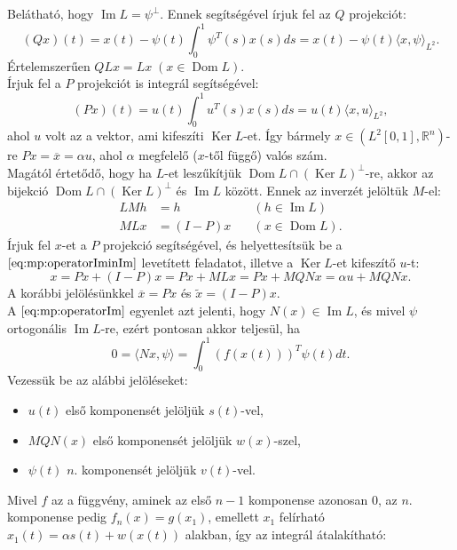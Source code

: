 \documentclass[oneside, titlepage, 12pt, a4paper]{report}
\DeclareMathOperator{\Ima}{Im}	%
\DeclareMathOperator{\Ker}{Ker}	%
\DeclareMathOperator{\Dom}{Dom}	%
\begin{document}
Belátható, hogy $\Ima L = {\psi}^\perp$. %
Ennek segítségével írjuk fel az $Q$ projekciót:
\begin{equation*}
(Qx) (t) = x(t) - \psi(t) \int_0^1 \psi^T(s) x(s) ds = x(t) - \psi(t) \langle x, \psi \rangle_{L^2}.
\end{equation*}
Értelemszerűen $Q L x = L x \; (x \in \Dom L)$. \\
Írjuk fel a $P$ projekciót is integrál segítségével:
\begin{equation*}
(Px)(t) = u(t) \int_0^1 u^T(s) x(s) ds = u(t) \langle x, u \rangle_{L^2},
\end{equation*}
ahol $u$ volt az a vektor, ami kifeszíti $\Ker L$-et. Így bármely $x \in ( L^2[0, 1], \mathbb{R}^n)$-re $Px = \overline{x} = \alpha u$, ahol $\alpha$ megfelelő ($x$-től függő) valós szám. \\
Magától értetődő, hogy ha $L$-et leszűkítjük $\Dom L \cap (\Ker L)^\perp$-re, akkor az bijekció $\Dom L \cap (\Ker L)^\perp$ és $\Ima L$ között. Ennek az inverzét jelöltük $M$-el:
\begin{align*}
L M h &= h \quad &(h \in \Ima L) \\
M L x &= (I - P) x \quad &(x \in \Dom L).
\end{align*}
Írjuk fel $x$-et a $P$ projekció segítségével, és helyettesítsük be a $\eqref{eq:mp:operatorIminIm}$ levetített feladatot, illetve a $\Ker L$-et kifeszítő $u$-t:
\begin{equation*}
x = Px + (I - P)x = Px + M L x = P x + M Q N x = \alpha u + M Q N x.
\end{equation*}
A korábbi jelölésünkkel $\overline{x} = Px$ és $\widetilde{x} = (I - P)x$. \\
A $\eqref{eq:mp:operatorIm}$ egyenlet azt jelenti, hogy $N(x) \in \Ima L$, és mivel $\psi$ ortogonális $\Ima L$-re, ezért pontosan akkor teljesül, ha
\begin{equation*}
0 = \langle Nx, \psi \rangle = \int_0^1 \left( f(x(t)) \right)^T \psi(t) dt.
\end{equation*}
Vezessük be az alábbi jelöléseket:
\begin{itemize}
\item $u(t)$ első komponensét jelöljük $s(t)$-vel,
\item $M Q N (x)$ első komponensét jelöljük $w(x)$-szel,
\item $\psi(t)$ $n$. komponensét jelöljük $v(t)$-vel.
\end{itemize}
Mivel $f$ az a függvény, aminek az első $n-1$ komponense azonosan $0$, az $n$. komponense pedig $f_n(x) = g(x_1)$, emellett $x_1$ felírható $x_1(t) = \alpha s(t) + w(x(t))$ alakban, így az integrál átalakítható:
\end{document}
